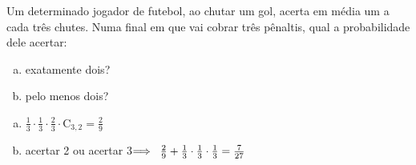 \begin{ex}
 Um determinado jogador de futebol, ao chutar um gol, acerta em média um a cada três chutes. Numa final em que vai cobrar três pênaltis, qual a probabilidade dele acertar:
    \begin{enumerate}[(a)]
    \item exatamente dois?
    \item pelo menos dois?
    \end{enumerate}
      \begin{sol}
          \phantom{A} 
        \begin{enumerate} [(a)]
            \item $\frac{1}{3}\cdot\frac{1}{3}\cdot\frac{2}{3}\cdot\mathrm{C}_{3,2}=\frac{2}{9}$
            \item acertar 2 ou acertar 3\hspace{0.3cm}$ \Longrightarrow\hspace{0.2cm} \frac{2}{9}+\frac{1}{3}\cdot\frac{1}{3}\cdot\frac{1}{3}=\frac{7}{27}$
        \end{enumerate}
      \end{sol}
\end{ex}